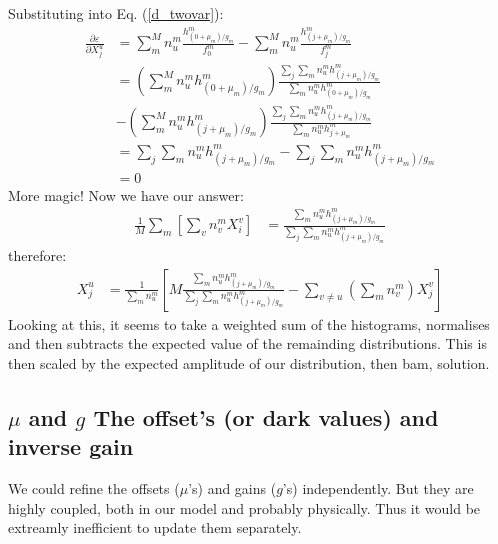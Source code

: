 \documentclass[11pt]{article}
\begin{document}
Substituting into Eq. (\ref{d_twovar}):
\begin{align}
   \frac{\partial \varepsilon}{\partial X^u_j} &= \sum_m^M n^m_u \frac{ h^m_{(0+\mu_m)/g_m}}{f^m_0}- \sum_m^M n^m_u \frac{ h^m_{(j+\mu_m)/g_m}}{f^m_j} \\
   &=  \left(\sum_m^M n^m_u h^m_{(0+\mu_m)/g_m}\right) \frac{\sum_{j}\sum_m n^m_u h^m_{(j+\mu_m)/g_m}}{\sum_m n^m_u h^m_{(0+\mu_m)/g_m}} \\
   & - \left(\sum_m^M n^m_u h^m_{(j+\mu_m)/g_m}\right) \frac{\sum_{j}\sum_m n^m_u h^m_{(j+\mu_m)/g_m}}{\sum_m n^m_u h^m_{j+\mu_m}} \\
   &= \sum_{j}\sum_m n^m_u h^m_{(j+\mu_m)/g_m} - \sum_{j}\sum_m n^m_u h^m_{(j+\mu_m)/g_m} \\
   &= 0
\end{align}
More magic! Now we have our answer:
\begin{align}
   \frac{1}{M}\sum_m \left[ \sum_v n^m_v X^v_i \right] &= \frac{\sum_m n^m_u h^m_{(j+\mu_m)/g_m}}{\sum_{j}\sum_m n^m_u h^m_{(j+\mu_m)/g_m}}
\end{align}
therefore:
\begin{align}
   X^u_j &= \frac{1}{\sum_m n^m_u}\left[M\frac{\sum_m n^m_u h^m_{(j+\mu_m)/g_m}}{\sum_{j}\sum_m n^m_u h^m_{(j+\mu_m)/g_m}} - \sum_{v\neq u} (\sum_m n^m_v) X^v_j \right] 
\end{align}
Looking at this, it seems to take a weighted sum of the histograms, normalises and then subtracts the expected value of the remainding distributions. This is then scaled by the expected amplitude of our distribution, then bam, solution.















\subsection{$\mu$ and $g$ The offset's (or dark values) and inverse gain}
We could refine the offsets ($\mu$'s) and gains ($g$'s) independently. But they are highly coupled, both in our model and probably physically. Thus it would be extreamly inefficient to update them separately.
\end{document}
